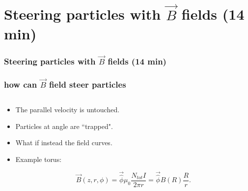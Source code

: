 \documentclass{beamer}
\begin{document}
\section{Steering particles with $\vec{B}$ fields (14 min)}

\begin{frame}
\frametitle{Steering particles with $\vec{B}$ fields (14 min)}
\tableofcontents[currentsection]
\end{frame}


\begin{frame}
\frametitle{how can $\vec{B}$ field steer particles}
\begin{columns}
\begin{column}{0.5\linewidth}
\begin{itemize}
\item<1-> The parallel velocity is untouched.

\item<2-> Particles at angle are ``trapped".

\item<3-> What if instead the field curves.

\item<4-> Example torus:

\begin{equation*}
\vec{B}(z,r,\phi)=\vec{\hat{\phi}}\mu_0\frac{N_{tot} I}{2\pi r}=\vec{\hat{\phi}} B(R)\frac{R}{r}.
\end{equation*}


\end{itemize}
\end{column}
\end{columns}
\end{frame}
\end{document}
